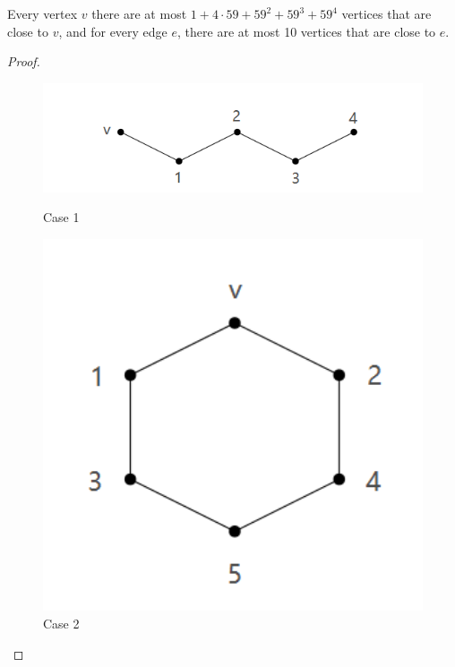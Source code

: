 \begin{claim}
Every vertex $v$ there are at most $1 + 4 \cdot 59 + 59^{2} + 59^{3} + 59^{4}$ vertices that are close to $v$, and for every edge $e$, there are at most 10 vertices that are close to $e$.\cite{dvorak2013threecoloring}
\end{claim}
\begin{proof}
    
    \begin{figure}[htbp]
    \centering
    \begin{minipage}[t]{0.48\textwidth}
    \centering
    \includegraphics[width=1\textwidth]{figure/592.png}
    \caption{Case 1}
    \end{minipage}
    \begin{minipage}[t]{0.28\textwidth}
    \centering
    \includegraphics[width=1\textwidth]{figure/591.png}
    \caption{Case 2}
    \end{minipage}
    \end{figure}

\end{proof}
